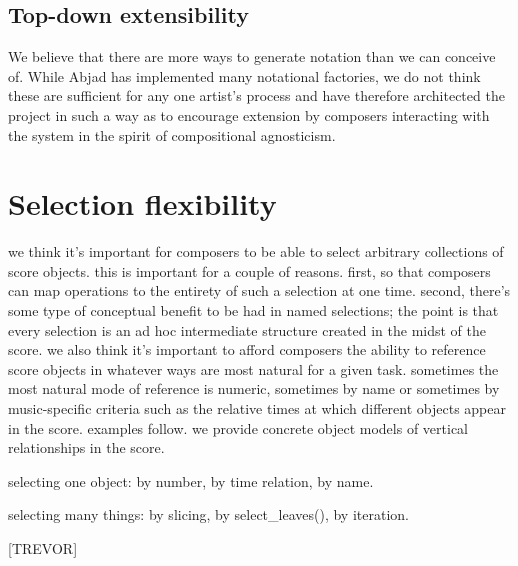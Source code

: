 \documentclass{article}
\begin{document}
\subsection{Top-down extensibility}

We believe that there are more ways to generate notation than we can conceive
of. While Abjad has implemented many notational factories, we do not think
these are sufficient for any one artist's process and have therefore
architected the project in such a way as to encourage extension by composers
interacting with the system in the spirit of compositional agnosticism.


\section{Selection flexibility} \label{sec:selections}

we think it's important for composers to be able to select arbitrary
collections of score objects. this is important for a couple of reasons. first,
so that composers can map operations to the entirety of such a selection at one
time. second, there's some type of conceptual benefit to be had in named
selections; the point is that every selection is an ad hoc intermediate
structure created in the midst of the score. we also think it's important to
afford composers the ability to reference score objects in whatever ways are
most natural for a given task. sometimes the most natural mode of reference is
numeric, sometimes by name or sometimes by music-specific criteria such as the
relative times at which different objects appear in the score. examples follow.
we provide concrete object models of vertical relationships in the score.

selecting one object: by number, by time relation, by name.

selecting many things: by slicing, by select\_leaves(), by iteration.

[TREVOR]

\end{document}
